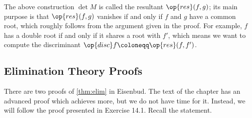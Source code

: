 \documentclass[../notes.tex]{subfiles}
\begin{document}
\begin{remark}
	The above construction $\det M$ is called the resultant $\op{res}(f,g)$; its main purpose is that $\op{res}(f,g)$ vanishes if and only if $f$ and $g$ have a common root, which roughly follows from the argument given in the proof. For example, $f$ has a double root if and only if it shares a root with $f'$, which means we want to compute the discriminant $\op{disc}f\coloneqq\op{res}(f,f')$.
\end{remark}

\subsection{Elimination Theory Proofs}
There are two proofs of \autoref{thm:elim} in Eisenbud. The text of the chapter has an advanced proof which achieves more, but we do not have time for it. Instead, we will follow the proof presented in Exercise 14.1. Recall the statement.
\elimthm*
\end{document}
